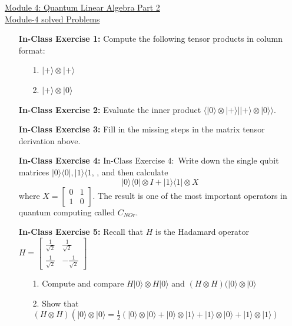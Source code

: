 \documentclass[main.tex]{subfiles}
\begin{document}
\href{https://www2.seas.gwu.edu/~simhaweb/quantum/modules/module4/module4.html}{Module 4: Quantum Linear Algebra Part 2}\\
\href{https://www2.seas.gwu.edu/~simhaweb/quantum/modules/module4/problems3.html}{Module-4 solved Problems}

\begin{enumerate}

\item[] \textbf{In-Class Exercise 1:} Compute the following tensor products in column format:
    \begin{enumerate}
        \item[1.] $|+\rangle \otimes|+\rangle$
        \item[2.] $|+\rangle \otimes|0\rangle$
    \end{enumerate}

\item[] \textbf{In-Class Exercise 2:} Evaluate the inner product $\langle\mid 0\rangle \otimes|+\rangle||+\rangle \otimes|0\rangle\rangle$.

\item[] \textbf{In-Class Exercise 3:} Fill in the missing steps in the matrix tensor derivation above.

\item[] \textbf{In-Class Exercise 4:} In-Class Exercise $4:$ Write down the single qubit matrices $|0\rangle\langle 0|,| 1\rangle\langle 1$, , and then calculate
$$|0\rangle\langle 0|\otimes I+| 1\rangle\langle 1| \otimes X$$
where $X=\left[\begin{array}{ll}0 & 1 \\ 1 & 0\end{array}\right]$. The result is one of the most important operators in quantum computing called $C_{N O r}$.

\item[] \textbf{In-Class Exercise 5:} Recall that $H$ is the Hadamard operator 
$H=\left[\begin{array}{cc}\frac{1}{\sqrt{2}} & \frac{1}{\sqrt{2}} \\ \frac{1}{\sqrt{2}} & -\frac{1}{\sqrt{2}}\end{array}\right]$
\begin{enumerate}
    \item[1.] Compute and compare $H|0\rangle \otimes H|0\rangle$ and $(H \otimes H)(|0\rangle \otimes|0\rangle$
    \item[2.] Show that $(H \otimes H)\left(|0\rangle \otimes|0\rangle=\frac{1}{2}(|0\rangle \otimes|0\rangle+|0\rangle \otimes|1\rangle+|1\rangle \otimes|0\rangle+|1\rangle \otimes|1\rangle)\right.$
\end{enumerate}


\end{enumerate}
\end{document}
